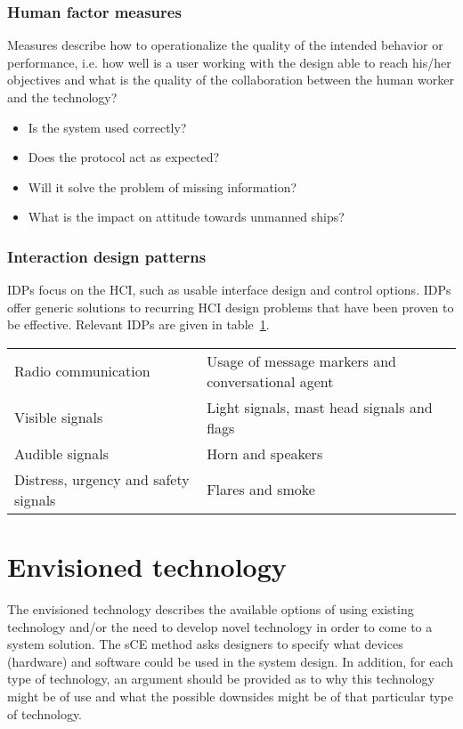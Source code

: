 \subsubsection{Human factor measures}
Measures describe how to operationalize the quality of the intended behavior or performance, i.e. how well is a user working with the design able to reach his/her objectives and what is the quality of the collaboration between the human worker and the technology?
\begin{itemize}
	\item Is the system used correctly?
	\item Does the protocol act as expected?
	\item Will it solve the problem of missing information?
	\item What is the impact on attitude towards unmanned ships?
\end{itemize}

\subsubsection{Interaction design patterns}
\acf{IDPs} focus on the \acf{HCI}, such as usable interface design and control options. IDPs offer generic solutions to recurring HCI design problems that have been proven to be effective. Relevant IDPs are given in table~\ref{tab:IDPs}.

\begin{table}[H]
	\centering
	\begin{tabular}{l|l}
		\toprule
		Radio communication & Usage of message markers and conversational agent \\
		Visible signals & Light signals, mast head signals and flags \\
		Audible signals & Horn and speakers \\
		Distress, urgency and safety signals & Flares and smoke \\
		\bottomrule
	\end{tabular}
	
	\label{tab:IDPs}
\end{table}

\section{Envisioned technology}
The envisioned technology describes the available options of using existing technology and/or the need to develop novel technology in order to come to a system solution. The sCE method asks designers to specify what devices (hardware) and software could be used in the system design. In addition, for each type of technology, an argument should be provided as to why this technology might be of use and what the possible downsides might be of that particular type of technology.

